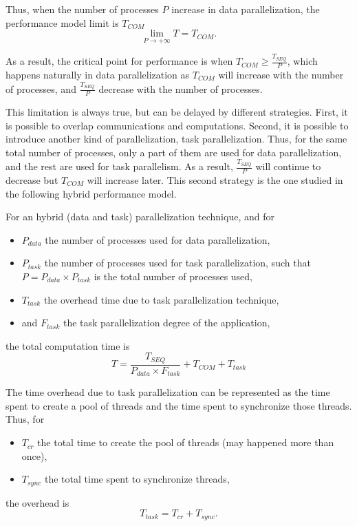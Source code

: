 Thus, when the number of processes $P$ increase in data parallelization, the performance model limit is $T_{COM}$
\begin{equation}
\lim\limits_{P \rightarrow +\infty} T = T_{COM}.
\end{equation}

As a result, the critical point for performance is when $T_{COM} \geq \frac{T_{SEQ}}{P}$, which happens naturally in data parallelization as $T_{COM}$ will increase with the number of processes, and $\frac{T_{SEQ}}{P}$ decrease with the number of processes.

This limitation is always true, but can be delayed by different strategies. First, it is possible to overlap communications and computations. Second, it is possible to introduce another kind of parallelization, task parallelization. Thus, for the same total number of processes, only a part of them are used for data parallelization, and the rest are used for task parallelism. As a result, $\frac{T_{SEQ}}{P}$ will continue to decrease but $T_{COM}$ will increase later. This second strategy is the one studied in the following hybrid performance model.

For an hybrid (data and task) parallelization technique, and for
\begin{itemize}
\item $P_{data}$ the number of processes used for data parallelization,
\item $P_{task}$ the number of processes used for task parallelization, such that $P = P_{data} \times P_{task}$ is the total number of processes used,
\item $T_{task}$ the overhead time due to task parallelization technique,
\item and $F_{task}$ the task parallelization degree of the application,
\end{itemize}
the total computation time is
\begin{equation}
T = \frac{T_{SEQ}}{P_{data} \times F_{task}} + T_{COM} + T_{task}
\end{equation}

The time overhead due to task parallelization can be represented as the time spent to create a pool of threads and the time spent to synchronize those threads. Thus, for
\begin{itemize}
\item $T_{cr}$ the total time to create the pool of threads (may happened more than once), 
\item $T_{sync}$ the total time spent to synchronize threads, 
\end{itemize}
the overhead is
\begin{equation*}
T_{task} = T_{cr} + T_{sync}.
\end{equation*}

